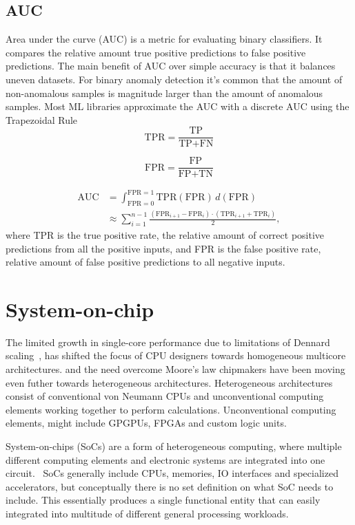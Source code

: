 \documentclass[12pt,a4paper,english
]{tunithesis}
\begin{document}
\subsection{AUC}
Area under the curve (AUC) is a metric for evaluating binary classifiers. It compares the relative amount true positive predictions to false positive predictions.
The main benefit of AUC over simple accuracy is that it balances uneven datasets. For binary anomaly detection it's common that the amount of non-anomalous samples is magnitude larger than the amount of anomalous samples.
Most ML libraries approximate the AUC with a discrete AUC using the Trapezoidal Rule~\cite{paszke_pytorch_2019}
\begin{equation}
\text{TPR} =  \frac{\text{TP}}{\text{TP} + \text{FN}}
\end{equation}

\begin{equation}
\text{FPR} = \frac{\text{FP}}{\text{FP} + \text{TN}}
\end{equation}

\begin{align}
\text{AUC} & = \int_{\text{FPR}=0}^{\text{FPR}=1} \text{TPR}(\text{FPR}) \, d(\text{FPR}) \\
& \approx \sum_{i=1}^{n-1} \frac{(\text{FPR}_{i+1} - \text{FPR}_i) \cdot (\text{TPR}_{i+1} + \text{TPR}_i)}{2},
\end{align}
where TPR is the true positive rate, the relative amount of correct positive predictions from all the positive inputs, and FPR is the false positive rate, relative amount of false positive predictions to all negative inputs.

\section{System-on-chip}
The limited growth in single-core performance due to limitations of Dennard scaling~\cite{esmaeilzadeh_dark_2011}, has shifted the focus of CPU designers towards homogeneous multicore architectures.
and the need overcome Moore's law chipmakers have been moving even futher towards heterogeneous architectures. Heterogeneous architectures consist of conventional von Neumann CPUs and unconventional computing elements working together to perform calculations. Unconventional computing elements, might include GPGPUs, FPGAs and custom logic units.~\cite{chung_single-chip_2010}

System-on-chips (SoCs) are a form of heterogeneous computing, where multiple different computing elements and electronic systems are integrated into one circuit.~\cite{Greaves2021}
SoCs generally include CPUs, memories, IO interfaces and specialized accelerators, but conceptually there is no set definition on what SoC needs to include.
This essentially produces a single functional entity that can easily integrated into multitude of different general processing workloads.
\end{document}

